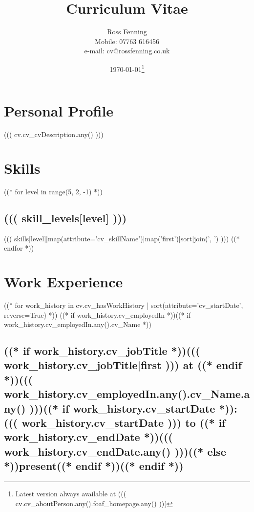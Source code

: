 \documentclass[10pt]{article}
\begin{document}
\title{\bf{Curriculum Vitae}}
\author{
  Ross Fenning\\
  Mobile: 07763 616456\\
  e-mail: cv@rossfenning.co.uk
}

\date{\today\footnote{Latest version always available at ((( cv.cv_aboutPerson.any().foaf_homepage.any() )))}}
\maketitle

\vspace{-0.5cm}

\hrulefill

\section*{Personal Profile}
((( cv.cv_cvDescription.any() )))

\section*{Skills}

((* for level in range(5, 2, -1) *))
\subsection*{((( skill_levels[level] )))}

((( skills[level]|map(attribute='cv_skillName')|map('first')|sort|join(', ') )))
((* endfor *))

\vfill

\section*{Work Experience}

((* for work_history in cv.cv_hasWorkHistory | sort(attribute='cv_startDate', reverse=True) *))
((* if work_history.cv_employedIn *))((* if work_history.cv_employedIn.any().cv_Name *))
\subsection*{((* if work_history.cv_jobTitle *))((( work_history.cv_jobTitle|first ))) at ((* endif *))((( work_history.cv_employedIn.any().cv_Name.any() )))((* if work_history.cv_startDate *)): ((( work_history.cv_startDate ))) to ((* if work_history.cv_endDate *))((( work_history.cv_endDate.any() )))((* else *))present((* endif *))((* endif *))}
\end{document}
